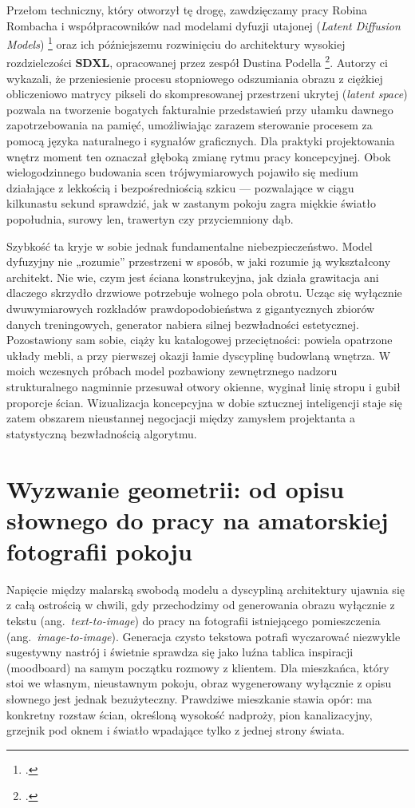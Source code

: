 Przełom techniczny, który otworzył tę drogę, zawdzięczamy pracy Robina Rombacha i współpracowników nad modelami dyfuzji utajonej (\emph{Latent Diffusion Models}) \footcite{rombach2022ldm} oraz ich późniejszemu rozwinięciu do architektury wysokiej rozdzielczości \textbf{SDXL}, opracowanej przez zespół Dustina Podella \footcite{podell2024sdxl}. Autorzy ci wykazali, że przeniesienie procesu stopniowego odszumiania obrazu z ciężkiej obliczeniowo matrycy pikseli do skompresowanej przestrzeni ukrytej (\emph{latent space}) pozwala na tworzenie bogatych fakturalnie przedstawień przy ułamku dawnego zapotrzebowania na pamięć, umożliwiając zarazem sterowanie procesem za pomocą języka naturalnego i sygnałów graficznych. Dla praktyki projektowania wnętrz moment ten oznaczał głęboką zmianę rytmu pracy koncepcyjnej. Obok wielogodzinnego budowania scen trójwymiarowych pojawiło się medium działające z lekkością i bezpośredniością szkicu --- pozwalające w ciągu kilkunastu sekund sprawdzić, jak w zastanym pokoju zagra miękkie światło popołudnia, surowy len, trawertyn czy przyciemniony dąb.

Szybkość ta kryje w sobie jednak fundamentalne niebezpieczeństwo. Model dyfuzyjny nie „rozumie” przestrzeni w sposób, w jaki rozumie ją wykształcony architekt. Nie wie, czym jest ściana konstrukcyjna, jak działa grawitacja ani dlaczego skrzydło drzwiowe potrzebuje wolnego pola obrotu. Ucząc się wyłącznie dwuwymiarowych rozkładów prawdopodobieństwa z gigantycznych zbiorów danych treningowych, generator nabiera silnej bezwładności estetycznej. Pozostawiony sam sobie, ciąży ku katalogowej przeciętności: powiela opatrzone układy mebli, a przy pierwszej okazji łamie dyscyplinę budowlaną wnętrza. W moich wczesnych próbach model pozbawiony zewnętrznego nadzoru strukturalnego nagminnie przesuwał otwory okienne, wyginał linię stropu i gubił proporcje ścian. Wizualizacja koncepcyjna w dobie sztucznej inteligencji staje się zatem obszarem nieustannej negocjacji między zamysłem projektanta a statystyczną bezwładnością algorytmu.

\section{Wyzwanie geometrii: od opisu słownego do pracy na amatorskiej fotografii pokoju}
\label{ch04:sec:t2i-i2i}

Napięcie między malarską swobodą modelu a dyscypliną architektury ujawnia się z całą ostrością w chwili, gdy przechodzimy od generowania obrazu wyłącznie z tekstu (ang.\ \emph{text-to-image}) do pracy na fotografii istniejącego pomieszczenia (ang.\ \emph{image-to-image}). Generacja czysto tekstowa potrafi wyczarować niezwykle sugestywny nastrój i świetnie sprawdza się jako luźna tablica inspiracji (moodboard) na samym początku rozmowy z klientem. Dla mieszkańca, który stoi we własnym, nieustawnym pokoju, obraz wygenerowany wyłącznie z opisu słownego jest jednak bezużyteczny. Prawdziwe mieszkanie stawia opór: ma konkretny rozstaw ścian, określoną wysokość nadproży, pion kanalizacyjny, grzejnik pod oknem i światło wpadające tylko z jednej strony świata.

